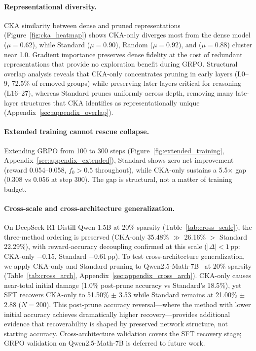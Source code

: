 

\paragraph{Representational diversity.}
CKA similarity between dense and pruned representations (Figure~\ref{fig:cka_heatmap}) shows CKA-only diverges most from the dense model ($\mu{=}0.62$), while Standard ($\mu{=}0.90$), Random ($\mu{=}0.92$), and \rasp{} ($\mu{=}0.88$) cluster near 1.0.
Gradient importance preserves dense fidelity at the cost of redundant representations that provide no exploration benefit during GRPO.
Structural overlap analysis reveals that CKA-only concentrates pruning in early layers (L0--9, 72.5\% of removed groups) while preserving later layers critical for reasoning (L16--27), whereas Standard prunes uniformly across depth, removing many late-layer structures that CKA identifies as representationally unique (Appendix~\ref{sec:appendix_overlap}).

\paragraph{Extended training cannot rescue collapse.}
Extending GRPO from 100 to 300 steps (Figure~\ref{fig:extended_training}, Appendix~\ref{sec:appendix_extended}), Standard shows zero net improvement (reward 0.054--0.058, $f_0 > 0.5$ throughout), while CKA-only sustains a 5.5$\times$ gap (0.308 vs 0.056 at step 300). The gap is structural, not a matter of training budget.

\paragraph{Cross-scale and cross-architecture generalization.}
On DeepSeek-R1-Distill-Qwen-1.5B at 20\% sparsity (Table~\ref{tab:cross_scale}), the three-method ordering is preserved (CKA-only 35.48\% $\gg$ \rasp{} 26.16\% $>$ Standard 22.29\%), with reward-accuracy decoupling confirmed at this scale ($|\Delta| < 1$\,pp: CKA-only $-$0.15, Standard $-$0.61\,pp).
To test cross-architecture generalization, we apply CKA-only and Standard pruning to Qwen2.5-Math-7B~\citep{qwen2.5} at 20\% sparsity (Table~\ref{tab:cross_arch}, Appendix~\ref{sec:appendix_cross_arch}).
CKA-only causes near-total initial damage (1.0\% post-prune accuracy vs Standard's 18.5\%), yet SFT recovers CKA-only to 51.50\% $\pm$ 3.53 while Standard remains at 21.00\% $\pm$ 2.88 ($N{=}200$).
This post-prune accuracy reversal---where the method with lower initial accuracy achieves dramatically higher recovery---provides additional evidence that recoverability is shaped by preserved network structure, not starting accuracy.
Cross-architecture validation covers the SFT recovery stage; GRPO validation on Qwen2.5-Math-7B is deferred to future work.



